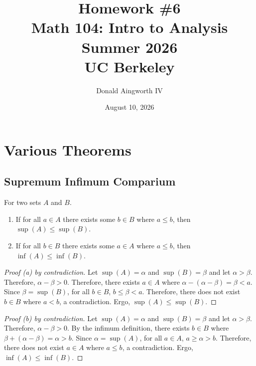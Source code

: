\documentclass[11pt]{article}
\title{Homework \#6\\{\large Math 104: Intro to Analysis \\ Summer 2026} \\ {\normalsize UC Berkeley}}
\date{August 10, 2026}
\author{Donald Aingworth IV}
\begin{document}
\renewcommand\qedsymbol{OE$\Delta$}
\newcommand{\abs}[1]{\left| #1 \right|}
\newcommand{\andtxt}{\text{ and }}
\newcommand{\Ais}{\ensuremath{\overset{A}{=}}}
\newcommand{\Cis}{\ensuremath{\overset{C}{=}}}
\newcommand{\closure}[1]{\ensuremath{\overline{#1}}}
\newcommand{\encircle}[1]{%
  \tikz[baseline=(char.base)]{%
    \node[shape=circle, draw, inner sep=1pt] (char) {#1};%
  }%
}
\newcommand{\mathif}{\text{if }}
\newcommand{\seq}[2][n]{\ensuremath{\left\{ #2 _{#1} \right\}}}
\newcommand{\zz}[1]{$\mathbb{Z}/ #1 \mathbb{Z}$}

\maketitle

\tableofcontents

\pagebreak
\setcounter{section}{-1}
\section{Various Theorems}
    \subsection{Supremum Infimum Comparium}
        \label{thm:1}
        For two sets $A$ and $B$.
        \begin{enumerate}[label=(\alph*)]
            \item   If for all $a \in A$ there exists some $b \in B$ where $a \leq b$, then $\sup(A) \leq \sup(B)$.
            \item   If for all $b \in B$ there exists some $a \in A$ where $a \leq b$, then $\inf(A) \leq \inf(B)$.
        \end{enumerate}
        \begin{proof}[Proof (a) by contradiction]
            Let $\sup(A) = \alpha$ and $\sup(B) = \beta$ and let $\alpha > \beta$.
            Therefore, $\alpha - \beta > 0$.
            Therefore, there exists $a \in A$ where $\alpha - (\alpha - \beta) = \beta < a$.
            Since $\beta = \sup(B)$, for all $b \in B$, $b \leq \beta < a$.
            Therefore, there does not exist $b \in B$ where $a < b$, a contradiction.
            Ergo, $\sup(A) \leq \sup(B)$.
        \end{proof}
        \begin{proof}[Proof (b) by contradiction]
            Let $\sup(A) = \alpha$ and $\sup(B) = \beta$ and let $\alpha > \beta$.
            Therefore, $\alpha - \beta > 0$.
            By the infimum definition, there exists $b \in B$ where $\beta + (\alpha - \beta) = \alpha > b$.
            Since $\alpha = \sup(A)$, for all $a \in A$, $a \geq \alpha > b$.
            Therefore, there does not exist $a \in A$ where $a \leq b$, a contradiction.
            Ergo, $\inf(A) \leq \inf(B)$.
        \end{proof}
\end{document}
